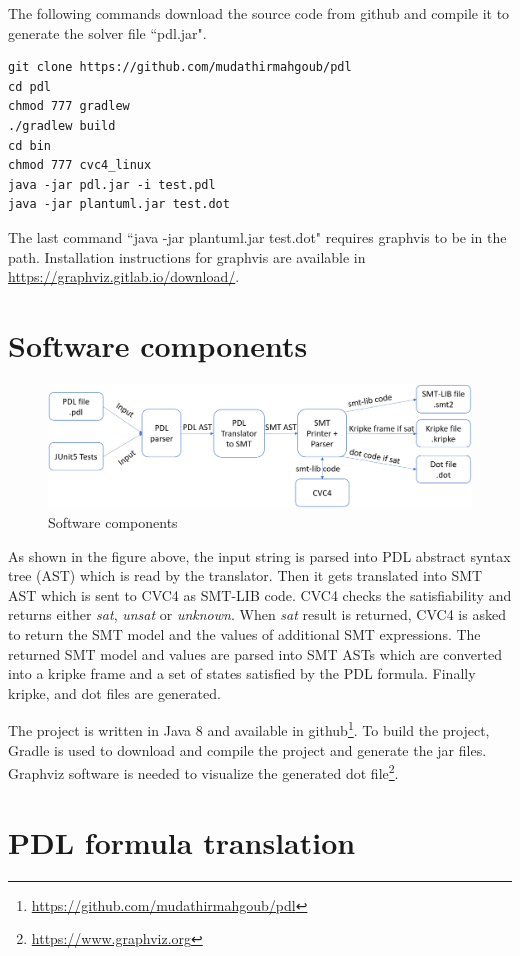 \documentclass[12pt,a4paper]{article}
\begin{document}
The following commands download the source code from github and compile it to generate the solver file ``pdl.jar". 

\begin{verbatim}
git clone https://github.com/mudathirmahgoub/pdl
cd pdl
chmod 777 gradlew
./gradlew build
cd bin
chmod 777 cvc4_linux
java -jar pdl.jar -i test.pdl 
java -jar plantuml.jar test.dot
\end{verbatim}

The last command ``java -jar plantuml.jar test.dot" requires graphvis to be in the path. Installation instructions for graphvis are available in \url{https://graphviz.gitlab.io/download/}. 

\section{Software components}
\begin{figure}[H]
\center
\includegraphics[scale=0.35]{solver.png}
\caption{Software components}
\end{figure}

As shown in the figure above, the input string is parsed into PDL abstract syntax tree (AST) which is read by the translator. Then it gets translated into SMT AST which is sent to CVC4 as SMT-LIB code. CVC4 checks the satisfiability and returns either \textit{sat}, \textit{unsat} or \textit{unknown}. When \textit{sat} result is returned, CVC4 is asked to return the SMT model and the values of additional SMT expressions. The returned SMT model and values are parsed into SMT ASTs which are converted into a kripke frame and a set of states satisfied by the PDL formula. Finally kripke, and dot files are generated. 

The project is written in Java 8 and available in github\footnote{\url{https://github.com/mudathirmahgoub/pdl}}. To build the project, Gradle is used to download and compile the project and generate the jar files. Graphviz software is needed to visualize the generated dot file\footnote{\url{https://www.graphviz.org}}. 

\section{PDL formula translation}
\end{document}
